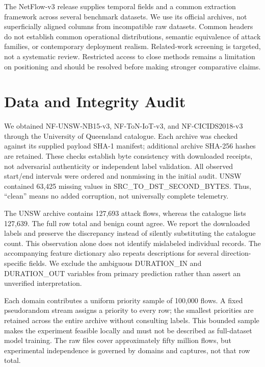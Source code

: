 \documentclass[manuscript,screen,nonacm]{acmart}
\begin{document}
The NetFlow-v3 release supplies temporal fields and a common extraction framework across several benchmark datasets\cite{temporal}. We use its official archives, not superficially aligned columns from incompatible raw datasets. Common headers do not establish common operational distributions, semantic equivalence of attack families, or contemporary deployment realism. Related-work screening is targeted, not a systematic review. Restricted access to close methods remains a limitation on positioning and should be resolved before making stronger comparative claims.

\section{Data and Integrity Audit}
We obtained NF-UNSW-NB15-v3, NF-ToN-IoT-v3, and NF-CICIDS2018-v3 through the University of Queensland catalogue\cite{catalogue}. Each archive was checked against its supplied payload SHA-1 manifest; additional archive SHA-256 hashes are retained. These checks establish byte consistency with downloaded receipts, not adversarial authenticity or independent label validation. All observed start/end intervals were ordered and nonmissing in the initial audit. UNSW contained 63,425 missing values in SRC\_TO\_DST\_SECOND\_BYTES. Thus, ``clean'' means no added corruption, not universally complete telemetry.


The UNSW archive contains 127,693 attack flows, whereas the catalogue lists 127,639. The full row total and benign count agree. We report the downloaded labels and preserve the discrepancy instead of silently substituting the catalogue count. This observation alone does not identify mislabeled individual records. The accompanying feature dictionary also repeats descriptions for several direction-specific fields. We exclude the ambiguous DURATION\_IN and DURATION\_OUT variables from primary prediction rather than assert an unverified interpretation.

Each domain contributes a uniform priority sample of 100,000 flows. A fixed pseudorandom stream assigns a priority to every row; the smallest priorities are retained across the entire archive without consulting labels. This bounded sample makes the experiment feasible locally and must not be described as full-dataset model training. The raw files cover approximately fifty million flows, but experimental independence is governed by domains and captures, not that row total.
\end{document}
